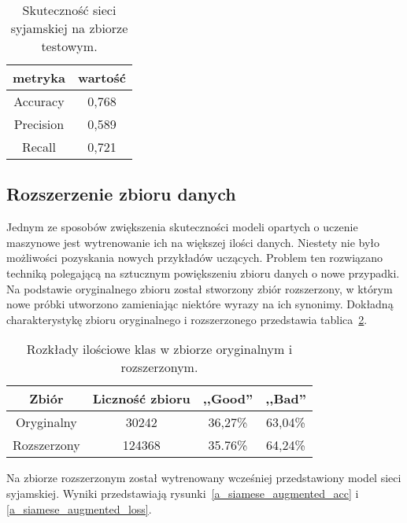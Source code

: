 \begin{table}[H]
\caption{Skuteczność sieci syjamskiej na zbiorze testowym.}
\label{train_set_statistics_score_table}
    \begin{center}
        \begin{tabular}{ |c|c| } 
            \hline
            metryka & wartość\\
            \hline
            Accuracy & 0,768 \\
            \hline
            Precision & 0,589 \\
            \hline
            Recall & 0,721 \\ 
            \hline
        \end{tabular}
    \end{center}
\end{table}

\subsection{Rozszerzenie zbioru danych}
Jednym ze sposobów zwiększenia skuteczności modeli opartych o uczenie maszynowe jest wytrenowanie ich na większej ilości danych. Niestety nie było możliwości pozyskania nowych przykładów uczących. Problem ten rozwiązano techniką polegającą na sztucznym powiększeniu zbioru danych o nowe przypadki. Na podstawie oryginalnego zbioru został stworzony zbiór rozszerzony, w którym nowe próbki utworzono zamieniając niektóre wyrazy na ich synonimy. 
Dokładną charakterystykę zbioru oryginalnego i rozszerzonego przedstawia tablica~\ref{a_augmented_set_percentage}.

\begin{table}[H]
\caption{Rozkłady ilościowe klas w zbiorze oryginalnym i rozszerzonym.}
\label{a_augmented_set_percentage}
    \begin{center}
        \begin{tabular}{ |c|c|c|c| } 
            \hline
            Zbiór & Liczność zbioru & ,,Good'' & ,,Bad''\\
            \hline
            Oryginalny & 30242 & 36,27\% & 63,04\%\\
            \hline
            Rozszerzony & 124368 & 35.76\% & 64,24\%\\ 
            \hline
        \end{tabular}
    \end{center}
\end{table}

Na zbiorze rozszerzonym został wytrenowany wcześniej przedstawiony model sieci syjamskiej. Wyniki przedstawiają rysunki~\ref{a_siamese_augmented_acc} i \ref{a_siamese_augmented_loss}.

